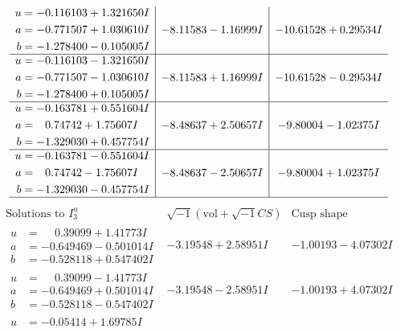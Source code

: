 \documentclass[1p]{elsarticle_modified}
\theoremstyle{definition}
\newcommand{\I}{\sqrt{-1}}
\begin{document}
$$\begin{array}{c|c|c}
\begin{aligned}
u &= -0.116103 + 1.321650 I \\
a &= -0.771507 + 1.030610 I \\
b &= -1.278400 - 0.105005 I\end{aligned}
 & -8.11583 - 1.16999 I & -10.61528 + 0.29534 I \\ \hline\begin{aligned}
u &= -0.116103 - 1.321650 I \\
a &= -0.771507 - 1.030610 I \\
b &= -1.278400 + 0.105005 I\end{aligned}
 & -8.11583 + 1.16999 I & -10.61528 - 0.29534 I \\ \hline\begin{aligned}
u &= -0.163781 + 0.551604 I \\
a &= \phantom{-}0.74742 + 1.75607 I \\
b &= -1.329030 + 0.457754 I\end{aligned}
 & -8.48637 + 2.50657 I & -9.80004 - 1.02375 I \\ \hline\begin{aligned}
u &= -0.163781 - 0.551604 I \\
a &= \phantom{-}0.74742 - 1.75607 I \\
b &= -1.329030 - 0.457754 I\end{aligned}
 & -8.48637 - 2.50657 I & -9.80004 + 1.02375 I\\
 \hline 
 \end{array}$$\newpage$$\begin{array}{c|c|c}  
\text{Solutions to }I^u_{3}& \I (\text{vol} + \sqrt{-1}CS) & \text{Cusp shape}\\
 \hline 
\begin{aligned}
u &= \phantom{-}0.39099 + 1.41773 I \\
a &= -0.649469 - 0.501014 I \\
b &= -0.528118 + 0.547402 I\end{aligned}
 & -3.19548 + 2.58951 I & -1.00193 - 4.07302 I \\ \hline\begin{aligned}
u &= \phantom{-}0.39099 - 1.41773 I \\
a &= -0.649469 + 0.501014 I \\
b &= -0.528118 - 0.547402 I\end{aligned}
 & -3.19548 - 2.58951 I & -1.00193 + 4.07302 I \\ \hline\begin{aligned}
u &= -0.05414 + 1.69785 I \\

\end{aligned}
\end{array}$$
\end{document}
